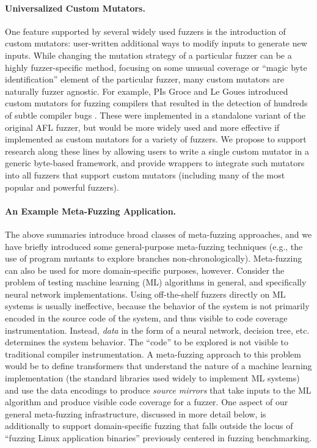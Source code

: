 \documentclass[numbers]{proposalnsf}
\begin{document}
\paragraph{Universalized Custom Mutators.}  One feature supported by several widely used fuzzers is the introduction of custom mutators:  user-written additional ways to modify inputs to generate new inputs.  While changing the mutation strategy of a particular fuzzer can be a highly fuzzer-specific method, focusing on some unusual coverage or ``magic byte identification'' element of the particular fuzzer, many custom mutators are naturally fuzzer agnostic.  For example, PIs Groce and Le Goues introduced custom mutators for fuzzing compilers that resulted in the detection of hundreds of subtle compiler bugs \cite{CC22}.  These were implemented in a standalone variant of the original AFL fuzzer, but would be more widely used and more effective if implemented as custom mutators for a variety of fuzzers.  We propose to support research along these lines by allowing users to write a single custom mutator in a generic byte-based framework, and provide wrappers to integrate such mutators into all fuzzers that support custom mutators (including many of the most popular and powerful fuzzers).
   
\paragraph{An Example Meta-Fuzzing Application.} The above summaries introduce broad classes of meta-fuzzing approaches, and we have briefly introduced some general-purpose meta-fuzzing techniques (e.g., the use of program mutants to explore branches non-chronologically).  Meta-fuzzing can also be used for more domain-specific purposes, however.  Consider the problem of testing machine learning (ML) algorithms in general, and specifically neural network implementations.  Using off-the-shelf fuzzers directly on ML systems is usually ineffective, because the behavior of the system is not primarily encoded in the source code of the system, and thus visible to code coverage instrumentation.  Instead, \emph{data} in the form of a neural network, decision tree, etc. determines the system behavior.  The ``code'' to be explored is not visible to traditional compiler instrumentation.  A meta-fuzzing approach to this problem would be to define transformers that understand the nature of a machine learning implementation (the standard libraries used widely to implement ML systems) and use the data encodings to produce \emph{source mirrors} that take inputs to the ML algorithm and produce visible code coverage for a fuzzer.  One aspect of our general meta-fuzzing infrastructure, discussed in more detail below, is additionally to support domain-specific fuzzing that falls outside the locus of ``fuzzing Linux application binaries'' previously centered in fuzzing benchmarking.
\end{document}

